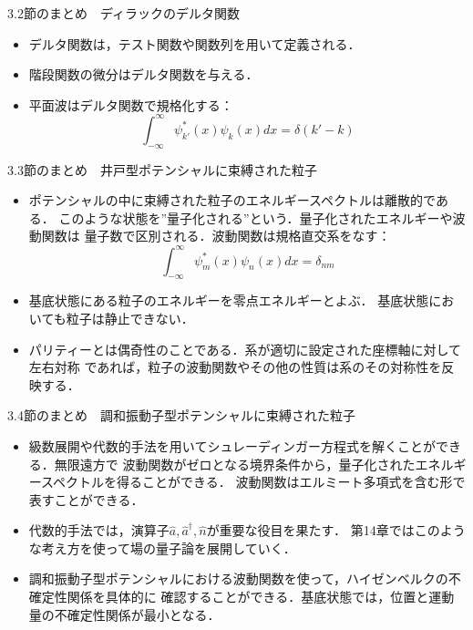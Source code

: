 \documentclass[11pt,a4paper]{jsarticle}
\begin{document}
		\begin{itembox}[l]{3.2節のまとめ　ディラックのデルタ関数}
			\begin{itemize}
				\item デルタ関数は，テスト関数や関数列を用いて定義される．
				\item 階段関数の微分はデルタ関数を与える．
				\item 平面波はデルタ関数で規格化する：
							$$\int_{-\infty}^\infty {\psi^*_{k'}}(x)\psi_k(x)dx = \delta(k' - k)$$
			\end{itemize}
			\end{itembox}

		\begin{itembox}[l]{3.3節のまとめ　井戸型ポテンシャルに束縛された粒子}
			\begin{itemize}
				\item ポテンシャルの中に束縛された粒子のエネルギースペクトルは離散的である．
							このような状態を”量子化される”という．量子化されたエネルギーや波動関数は
							量子数で区別される．波動関数は規格直交系をなす：
							$$\int_{-\infty}^\infty {\psi^*_{m}}(x)\psi_n(x)dx = \delta_{nm}$$
				\item 基底状態にある粒子のエネルギーを零点エネルギーとよぶ．
							基底状態においても粒子は静止できない．
				\item パリティーとは偶奇性のことである．系が適切に設定された座標軸に対して左右対称
							であれば，粒子の波動関数やその他の性質は系のその対称性を反映する．
			\end{itemize}
			\end{itembox}

		\begin{itembox}[l]{3.4節のまとめ　調和振動子型ポテンシャルに束縛された粒子}
			\begin{itemize}
				\item 級数展開や代数的手法を用いてシュレーディンガー方程式を解くことができる．無限遠方で
							波動関数がゼロとなる境界条件から，量子化されたエネルギースペクトルを得ることができる．
							波動関数はエルミート多項式を含む形で表すことができる．
				\item 代数的手法では，演算子$\hat{a},\hat{a}^\dagger, \hat{n}$が重要な役目を果たす．
							第14章ではこのような考え方を使って場の量子論を展開していく．
				\item 調和振動子型ポテンシャルにおける波動関数を使って，ハイゼンベルクの不確定性関係を具体的に
							確認することができる．基底状態では，位置と運動量の不確定性関係が最小となる．
			\end{itemize}
			\end{itembox}
\end{document}
